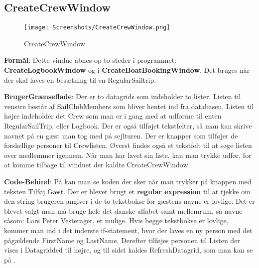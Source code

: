 \subsection{CreateCrewWindow}

\begin{wrapfigure}{r}{0.5\textwidth}
    \label{img:login_interface}
    \vspace{-20pt}
    \begin{center}
        \texttt{[image: Screenshots/CreateCrewWindow.png]}
    \end{center}
    \vspace{-20pt}
    \caption{CreateCrewWindow}
    \vspace{-30pt}
\end{wrapfigure}

\textbf{Formål}: Dette vindue åbnes op to steder i programmet: \textbf{CreateLogbookWindow} og i \textbf{CreateBoatBookingWindow}. Det bruges når der skal laves en besætning til en RegularSailtrip.  

\textbf{BrugerGrænseflade}: Der er to datagrids som indeholder to lister. Listen til venstre består af SailClubMembers som bliver hentet ind fra databasen. Listen til højre indeholder det Crew som man er i gang med at udforme til enten RegularSailTrip, eller Logbook. Der er også tilføjet tekstfelter, så man kan skrive navnet på en gæst man tog med på sejlturen. Der er knapper som tilføjer de forskellige personer til Crewlisten. Øverst findes også et tekstfelt til at søge listen over medlemmer igennem. Når man har lavet sin liste, kan man trykke udfør, for at komme tilbage til vinduet der kaldte CreateCrewWindow.

\textbf{Code-Behind}: 
På  kan man se koden der sker når man trykker på knappen med teksten Tilføj Gæst.
Der er blevet brugt et \textbf{regular expression} til at tjekke om den string brugeren angiver i de to tekstbokse for gæstens navne er lovlige. 
Det er blevet valgt man må bruge hele det danske alfabet samt mellemrum, så navne såsom: Lars Peter Vesterager, er mulige.
Hvis begge tekstbokse er lovlige, kommer man ind i det inderste if-statement, hvor der laves en ny person med det pågældende FirstName og LastName. 
Derefter tilføjes personen til Listen der vises i Datagridded til højre, og til sidst kaldes RefreshDatagrid, som man kan se på .

